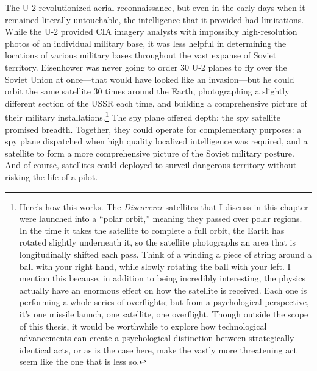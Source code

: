 \documentclass{memoir}
\begin{document}
The U-2 revolutionized aerial reconnaissance, but even in the early days when it remained literally untouchable, the intelligence that it provided had limitations. While the U-2 provided CIA imagery analysts with impossibly high-resolution photos of an individual military base, it was less helpful in determining the locations of various military bases throughout the vast expanse of Soviet territory. Eisenhower was never going to order 30 U-2 planes to fly over the Soviet Union at once---that would have looked like an invasion---but he could orbit the same satellite 30 times around the Earth, photographing a slightly different section of the USSR each time, and building a comprehensive picture of their military installations.\footnote{Here's how this works. The \emph{Discoverer} satellites that I discuss in this chapter were launched into a ``polar orbit,'' meaning they passed over polar regions. In the time it takes the satellite to complete a full orbit, the Earth has rotated slightly underneath it, so the satellite photographs an area that is longitudinally shifted each pass. Think of a winding a piece of string around a ball with your right hand, while slowly rotating the ball with your left. I mention this because, in addition to being incredibly interesting, the physics actually have an enormous effect on how the satellite is received. Each one is performing a whole series of overflights; but from a psychological perspective, it's one missile launch, one satellite, one overflight. Though outside the scope of this thesis, it would be worthwhile to explore how technological advancements can create a psychological distinction between strategically identical acts, or as is the case here, make the vastly more threatening act seem like the one that is less so.} The spy plane offered depth; the spy satellite promised breadth. Together, they could operate for complementary purposes: a spy plane dispatched when high quality localized intelligence was required, and a satellite to form a more comprehensive picture of the Soviet military posture. And of course, satellites could deployed to surveil dangerous territory without risking the life of a pilot.
\end{document}
